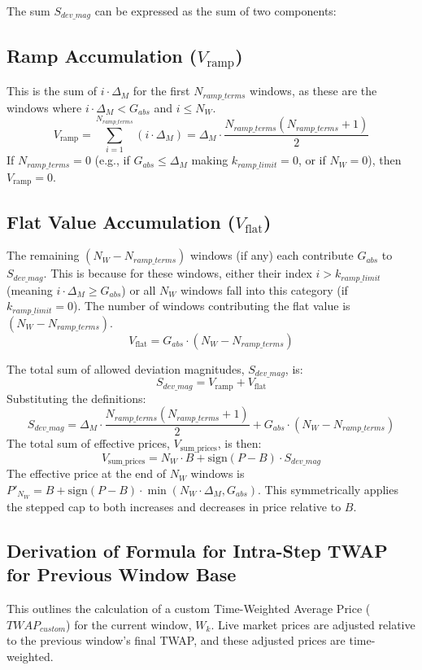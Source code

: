 \documentclass{article}
\begin{document}
The sum $S_{dev\_mag}$ can be expressed as the sum of two components:

\subsection*{Ramp Accumulation ($V_{\text{ramp}}$)}
This is the sum of $i \cdot \Delta_M$ for the first $N_{ramp\_terms}$ windows, as these are the windows where $i \cdot \Delta_M < G_{abs}$ and $i \le N_W$.
\[ V_{\text{ramp}} = \sum_{i=1}^{N_{ramp\_terms}} (i \cdot \Delta_M) = \Delta_M \cdot \frac{N_{ramp\_terms}(N_{ramp\_terms}+1)}{2} \]
If $N_{ramp\_terms}=0$ (e.g., if $G_{abs} \le \Delta_M$ making $k_{ramp\_limit}=0$, or if $N_W=0$), then $V_{\text{ramp}} = 0$.

\subsection*{Flat Value Accumulation ($V_{\text{flat}}$)}
The remaining $(N_W - N_{ramp\_terms})$ windows (if any) each contribute $G_{abs}$ to $S_{dev\_mag}$. This is because for these windows, either their index $i > k_{ramp\_limit}$ (meaning $i \cdot \Delta_M \ge G_{abs}$) or all $N_W$ windows fall into this category (if $k_{ramp\_limit}=0$).
The number of windows contributing the flat value is $(N_W - N_{ramp\_terms})$.
\[ V_{\text{flat}} = G_{abs} \cdot (N_W - N_{ramp\_terms}) \]

The total sum of allowed deviation magnitudes, $S_{dev\_mag}$, is:
\[ S_{dev\_mag} = V_{\text{ramp}} + V_{\text{flat}} \]
Substituting the definitions:
\[ S_{dev\_mag} = \Delta_M \cdot \frac{N_{ramp\_terms}(N_{ramp\_terms}+1)}{2} + G_{abs} \cdot (N_W - N_{ramp\_terms}) \]
The total sum of effective prices, $V_{\text{sum\_prices}}$, is then:
\[ V_{\text{sum\_prices}} = N_W \cdot B + \text{sign}(P-B) \cdot S_{dev\_mag} \]
The effective price at the end of $N_W$ windows is $P'_{N_W} = B + \text{sign}(P-B) \cdot \min(N_W \cdot \Delta_M, G_{abs})$. This symmetrically applies the stepped cap to both increases and decreases in price relative to $B$.

\subsection{Derivation of Formula for Intra-Step TWAP for Previous Window Base}
This outlines the calculation of a custom Time-Weighted Average Price ($TWAP_{custom}$) for the current window, $W_k$. Live market prices are adjusted relative to the previous window's final TWAP, and these adjusted prices are time-weighted.
\end{document}
